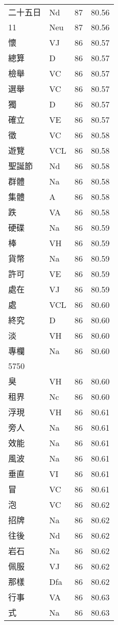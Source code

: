 \documentclass[twocolumn]{book}
\begin{document}
\begin{supertabular}{llrr}
二十五日 & Nd & 87 &  80.56\\
11 & Neu & 87 &  80.56\\
懷 & VJ & 86 &  80.57\\
總算 & D & 86 &  80.57\\
檢舉 & VC & 86 &  80.57\\
選舉 & VC & 86 &  80.57\\
獨 & D & 86 &  80.57\\
確立 & VE & 86 &  80.57\\
徵 & VC & 86 &  80.58\\
遊覽 & VCL & 86 &  80.58\\
聖誕節 & Nd & 86 &  80.58\\
群體 & Na & 86 &  80.58\\
集體 & A & 86 &  80.58\\
跌 & VA & 86 &  80.58\\
硬碟 & Na & 86 &  80.59\\
棒 & VH & 86 &  80.59\\
貨幣 & Na & 86 &  80.59\\
許可 & VE & 86 &  80.59\\
處在 & VJ & 86 &  80.59\\
處 & VCL & 86 &  80.60\\
終究 & D & 86 &  80.60\\
淡 & VH & 86 &  80.60\\
專欄 & Na & 86 &  80.60\\
5750\\
臭 & VH & 86 &  80.60\\
租界 & Nc & 86 &  80.60\\
浮現 & VH & 86 &  80.61\\
旁人 & Na & 86 &  80.61\\
效能 & Na & 86 &  80.61\\
風波 & Na & 86 &  80.61\\
垂直 & VI & 86 &  80.61\\
冒 & VC & 86 &  80.61\\
泡 & VC & 86 &  80.62\\
招牌 & Na & 86 &  80.62\\
往後 & Nd & 86 &  80.62\\
岩石 & Na & 86 &  80.62\\
佩服 & VJ & 86 &  80.62\\
那樣 & Dfa & 86 &  80.62\\
行事 & VA & 86 &  80.63\\
式 & Na & 86 &  80.63\\

\end{supertabular}
\end{document}
